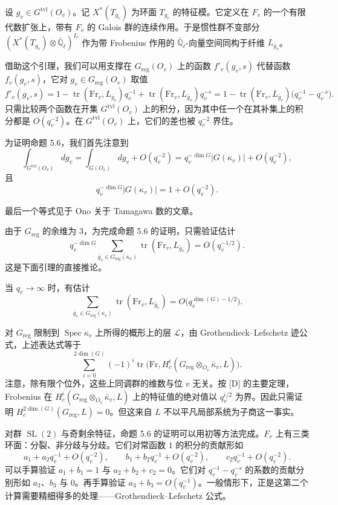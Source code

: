 \begin{lemma}
\setcounter{theorem}{9}
设 $g_v\in G^{\mathrm{tvl}}(O_v)$。记 $X^*(T_{g_v})$ 为环面 $T_{g_v}$ 的特征模。它定义在 $F_v$ 的一个有限代数扩张上，带有 $F_v$ 的 Galois 群的连续作用。于是惯性群不变部分 $(X^*(T_{g_v})\otimes\bar{\mathbb Q}_\ell)^{I_v}$ 作为带 Frobenius 作用的 $\bar{\mathbb Q}_\ell$-向量空间同构于纤维 $L_{\bar g_v}$。
\end{lemma}

借助这个引理，我们可以用支撑在 $G_{\mathrm{reg}}(O_v)$ 上的函数 $f'_v(g_v,s)$ 代替函数 $f_v(g_v,s)$，它对 $g_v\in G_{\mathrm{reg}}(O_v)$ 取值
\[
f'_v(g_v,s)=1-\operatorname{tr}(\mathrm{Fr}_v,L_{\bar g_v})q_v^{-1}
+\operatorname{tr}(\mathrm{Fr}_v,L_{\bar g_v})q_v^{-s}
=1-\operatorname{tr}(\mathrm{Fr}_v,L_{\bar g_v})\bigl(q_v^{-1}-q_v^{-s}\bigr).
\]
只需比较两个函数在开集 $G^{\mathrm{tvl}}(O_v)$ 上的积分，因为其中任一个在其补集上的积分都是 $O(q_v^{-2})$。在 $G^{\mathrm{tvl}}(O_v)$ 上，它们的差也被 $q_v^{-2}$ 界住。

为证明命题 5.6，我们首先注意到
\[
\int_{G^{\mathrm{tvl}}(O_v)}dg_v=\int_{G(O_v)}dg_v+O(q_v^{-2})
=q_v^{-\dim G}|G(\kappa_v)|+O(q_v^{-2}),
\]
且
\begin{equation}\tag{5.11}
q_v^{-\dim G}|G(\kappa_v)|=1+O(q_v^{-2}).
\end{equation}

最后一个等式见于 Ono 关于 Tamagawa 数的文章。

由于 $G_{\mathrm{reg}}$ 的余维为 $3$，为完成命题 5.6 的证明，只需验证估计
\begin{equation}\tag{5.12}
q_v^{-\dim G}\sum_{\bar g_v\in G_{\mathrm{reg}}(\kappa_v)}\operatorname{tr}(\mathrm{Fr}_v,L_{\bar g_v})
=O(q_v^{-1/2}).
\end{equation}
这是下面引理的直接推论。

\begin{lemma}
\setcounter{theorem}{12}
当 $q_v\to\infty$ 时，有估计
\[
\sum_{\bar g_v\in G_{\mathrm{reg}}(\kappa_v)}\operatorname{tr}(\mathrm{Fr}_v,L_{\bar g_v})
=O\bigl(q_v^{\dim(G)-1/2}\bigr).
\]
\end{lemma}

对 $G_{\mathrm{reg}}$ 限制到 $\operatorname{Spec}\kappa_v$ 上所得的概形上的层 $\mathcal L$，由 Grothendieck–Lefschetz 迹公式，上述表达式等于
\[
\sum_{i=0}^{2\dim(G)}(-1)^i\operatorname{tr}\bigl(\mathrm{Fr},H^i_c(G_{\mathrm{reg}}\otimes_{O_v}\bar\kappa_v,L)\bigr).
\]
注意，除有限个位外，这些上同调群的维数与位 $v$ 无关。按 [D] 的主要定理，Frobenius 在 $H^i_c(G_{\mathrm{reg}}\otimes_{O_v}\bar\kappa_v,L)$ 上的特征值的绝对值以 $q_v^{i/2}$ 为界。因此只需证明 $H^{2\dim(G)}_c(G_{\mathrm{reg}},L)=0$。但这来自 $L$ 不以平凡局部系统为子商这一事实。

对群 $\operatorname{SL}(2)$ 与奇剩余特征，命题 5.6 的证明可以用初等方法完成。$F_v$ 上有三类环面：分裂、非分歧与分歧。它们对常函数 $1$ 的积分的贡献形如
\[
a_1+a_2q_v^{-1}+O(q_v^{-2}),\qquad
b_1+b_2q_v^{-1}+O(q_v^{-2}),\qquad
c_2q_v^{-1}+O(q_v^{-2}).
\]
可以手算验证 $a_1+b_1=1$ 与 $a_2+b_2+c_2=0$。它们对 $q_v^{-1}-q_v^{-s}$ 的系数的贡献分别形如 $a_3$、$b_3$ 与 $0$。再手算验证 $a_3+b_3=O(q_v^{-1})$。一般情形下，正是这第二个计算需要精细得多的处理——Grothendieck–Lefschetz 公式。
